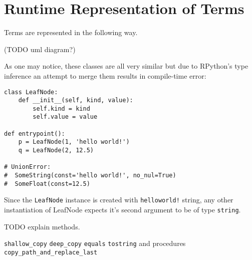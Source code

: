 \section{Runtime Representation of Terms}

Terms are represented in the following way. 

(TODO uml diagram?) 

As one may notice, these classes are all very similar but due to RPython's type inference an attempt to merge them results in compile-time error:

\begin{lstlisting}
class LeafNode:
    def __init__(self, kind, value):
        self.kind = kind 
        self.value = value

def entrypoint():
    p = LeafNode(1, 'hello world!')
    q = LeafNode(2, 12.5)

# UnionError:
#  SomeString(const='hello world!', no_nul=True)
#  SomeFloat(const=12.5)
\end{lstlisting}

Since the \texttt{LeafNode} instance is created with \texttt{helloworld!} string, any other instantiation of LeafNode expects it's second argument to be of type \texttt{string}. 

TODO explain methods.

\texttt{shallow\_copy}
\texttt{deep\_copy} 
\texttt{equals}
\texttt{tostring}
and procedures
\texttt{copy\_path\_and\_replace\_last}
